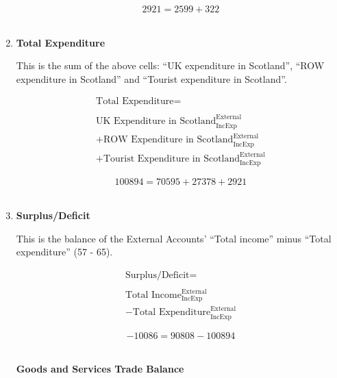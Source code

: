 \begin{enumerate}
\begin{equation} \nonumber
2921 = 2599+322
\end{equation}\\


\item \textbf {Total Expenditure}

This is the sum of the above cells: ``UK expenditure in Scotland'', ``ROW expenditure in Scotland'' and ``Tourist expenditure in Scotland''.

\begin{equation}
\begin{split}
\text{Total Expenditure} =  \\ \\
\text{UK Expenditure in Scotland}^\text{External}_\text{IncExp}\\
+\text{ROW Expenditure in Scotland}^\text{External}_\text{IncExp}\\
+\text{Tourist Expenditure in Scotland}^\text{External}_\text{IncExp}
\end{split} \label{eq:2.5.69}
\end{equation}

\begin{equation} \nonumber
100894 = 70595+27378+2921
\end{equation}\\


\item \textbf {Surplus/Deficit}

This is the balance of the External Accounts’ ``Total income'' minus ``Total expenditure'' (57 - 65).

\begin{equation}
\begin{split}
\text{Surplus/Deficit} =  \\ \\
\text{Total Income}^\text{External}_\text{IncExp}\\
-\text{Total Expenditure}^\text{External}_\text{IncExp}
\end{split} \label{eq:2.5.70}
\end{equation}

\begin{equation} \nonumber
-10086 = 90808-100894
\end{equation}\\



\pagebreak


\begin{center}
\textbf{\LARGE Goods and Services Trade Balance}
\end{center}


\end{enumerate}

